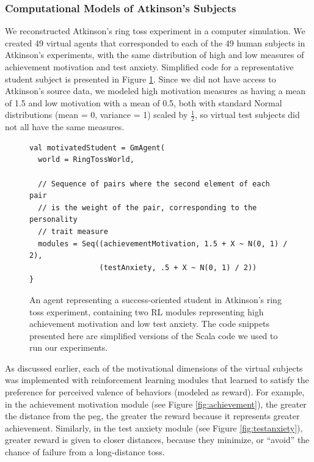 \subsubsection{Computational Models of Atkinson's Subjects}

We reconstructed Atkinson's ring toss experiment in a computer simulation.  We created 49 virtual agents that corresponded to each of the 49 human subjects in Atkinson's experiments, with the same distribution of high and low measures of achievement motivation and test anxiety.  Simplified code for a representative student subject is presented in Figure \ref{fig:student}.  Since we did not have access to Atkinson's source data, we modeled high motivation measures as having a mean of 1.5 and low motivation with a mean of 0.5, both with standard Normal distributions (mean = 0, variance = 1) scaled by $\frac{1}{2}$, so virtual test subjects did not all have the same measures.

\begin{figure}[h]

\begin{lstlisting}
val motivatedStudent = GmAgent(
  world = RingTossWorld,

  // Sequence of pairs where the second element of each pair
  // is the weight of the pair, corresponding to the personality
  // trait measure
  modules = Seq((achievementMotivation, 1.5 + X ~ N(0, 1) / 2),
                (testAnxiety, .5 + X ~ N(0, 1) / 2))
}
\end{lstlisting}

\caption{An agent representing a success-oriented student in Atkinson's ring toss experiment, containing two RL modules representing high achievement motivation and low test anxiety.  The code snippets presented here are simplified versions of the Scala code we used to run our experiments.}
\label{fig:student}
\end{figure}

As discussed earlier, each of the motivational dimensions of the virtual subjects was implemented with reinforcement learning modules that learned to satisfy the preference for perceived valence of behaviors (modeled as reward).  For example, in the achievement motivation module (see Figure \ref{fig:achievement}), the greater the distance from the peg, the greater the reward because it represents greater achievement.  Similarly, in the test anxiety module (see Figure \ref{fig:testanxiety}), greater reward is given to closer distances, because they minimize, or ``avoid'' the chance of failure from a long-distance toss.

